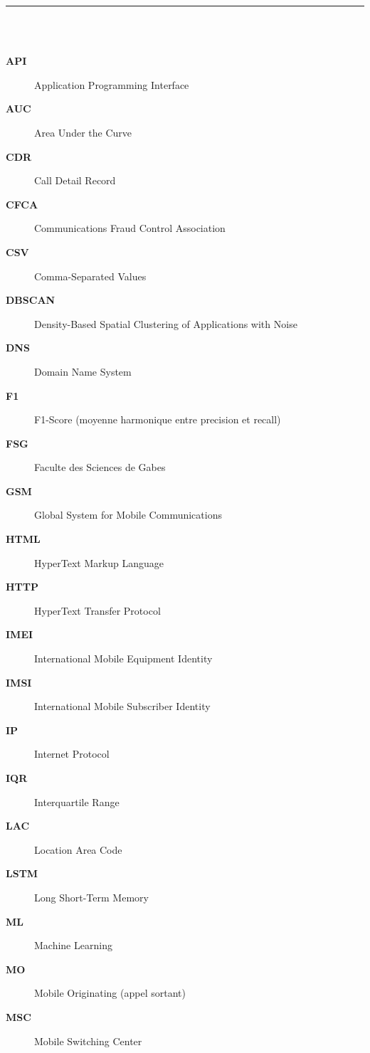 \documentclass[12pt, oneside, a4paper]{report}
\begin{document}
\clearpage
\thispagestyle{plain}

\noindent\rule[-0.2cm]{0.45cm}{1.2cm}\hspace{0.15cm}%
\raisebox{0.85cm}{\rule{0.85\textwidth}{0.5pt}}\\[0.3cm]
\noindent{}\\[1.0cm]

\begin{description}
\item[\textbf{API}] Application Programming Interface
\item[\textbf{AUC}] Area Under the Curve
\item[\textbf{CDR}] Call Detail Record
\item[\textbf{CFCA}] Communications Fraud Control Association
\item[\textbf{CSV}] Comma-Separated Values
\item[\textbf{DBSCAN}] Density-Based Spatial Clustering of Applications with Noise
\item[\textbf{DNS}] Domain Name System
\item[\textbf{F1}] F1-Score (moyenne harmonique entre precision et recall)
\item[\textbf{FSG}] Faculte des Sciences de Gabes
\item[\textbf{GSM}] Global System for Mobile Communications
\item[\textbf{HTML}] HyperText Markup Language
\item[\textbf{HTTP}] HyperText Transfer Protocol
\item[\textbf{IMEI}] International Mobile Equipment Identity
\item[\textbf{IMSI}] International Mobile Subscriber Identity
\item[\textbf{IP}] Internet Protocol
\item[\textbf{IQR}] Interquartile Range
\item[\textbf{LAC}] Location Area Code
\item[\textbf{LSTM}] Long Short-Term Memory
\item[\textbf{ML}] Machine Learning
\item[\textbf{MO}] Mobile Originating (appel sortant)
\item[\textbf{MSC}] Mobile Switching Center

\end{description}
\end{document}
